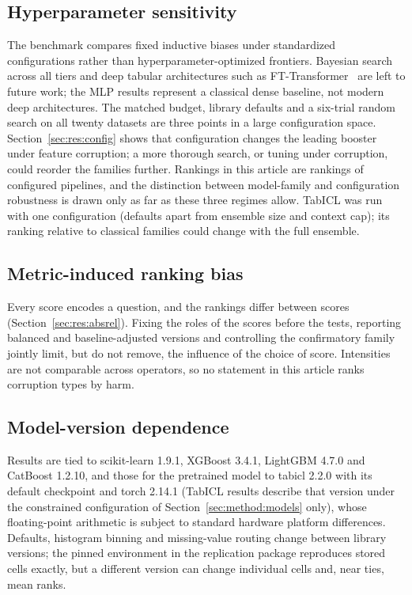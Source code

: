 \documentclass[pdflatex,sn-mathphys]{sn-jnl}
\theoremstyle{thmstyleone}
\theoremstyle{thmstyletwo}
\theoremstyle{thmstylethree}
\begin{document}
\subsection{Hyperparameter sensitivity}\label{sec:threats:hyper}
The benchmark compares fixed inductive biases under standardized configurations rather than hyperparameter-optimized frontiers. Bayesian search across all tiers and deep tabular architectures such as FT-Transformer~\cite{gorishniy2021revisiting} are left to future work; the MLP results represent a classical dense baseline, not modern deep architectures. The matched budget, library defaults and a six-trial random search on all twenty datasets are three points in a large configuration space. Section~\ref{sec:res:config} shows that configuration changes the leading booster under feature corruption; a more thorough search, or tuning under corruption, could reorder the families further. Rankings in this article are rankings of configured pipelines, and the distinction between model-family and configuration robustness is drawn only as far as these three regimes allow. TabICL was run with one configuration (defaults apart from ensemble size and context cap); its ranking relative to classical families could change with the full ensemble.

\subsection{Metric-induced ranking bias}\label{sec:threats:metric}
Every score encodes a question, and the rankings differ between scores (Section~\ref{sec:res:absrel}). Fixing the roles of the scores before the tests, reporting balanced and baseline-adjusted versions and controlling the confirmatory family jointly limit, but do not remove, the influence of the choice of score. Intensities are not comparable across operators, so no statement in this article ranks corruption types by harm.

\subsection{Model-version dependence}\label{sec:threats:version}
Results are tied to scikit-learn 1.9.1, XGBoost 3.4.1, LightGBM 4.7.0 and CatBoost 1.2.10, and those for the pretrained model to tabicl 2.2.0 with its default checkpoint and torch 2.14.1 (TabICL results describe that version under the constrained configuration of Section~\ref{sec:method:models} only), whose floating-point arithmetic is subject to standard hardware platform differences. Defaults, histogram binning and missing-value routing change between library versions; the pinned environment in the replication package reproduces stored cells exactly, but a different version can change individual cells and, near ties, mean ranks.
\end{document}
